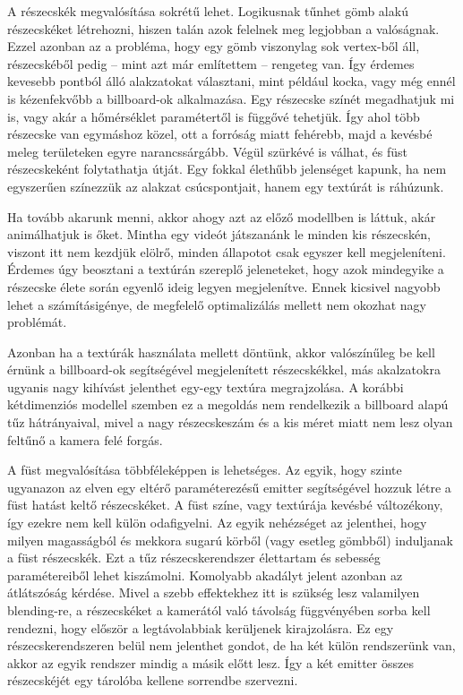 A részecskék megvalósítása sokrétű lehet. Logikusnak tűnhet gömb alakú részecskéket létrehozni, hiszen talán azok felelnek meg legjobban  a valóságnak. Ezzel azonban az a probléma, hogy egy gömb viszonylag sok vertex-ből áll, részecskéből pedig -- mint azt már említettem -- rengeteg van. Így érdemes kevesebb pontból álló alakzatokat választani, mint például kocka, vagy még ennél is kézenfekvőbb a billboard-ok alkalmazása. Egy részecske színét megadhatjuk mi is, vagy akár a hőmérséklet paramétertől is függővé tehetjük. Így ahol több részecske van egymáshoz közel, ott a forróság miatt fehérebb, majd a kevésbé meleg területeken egyre narancssárgább. Végül szürkévé is válhat, és füst részecskeként folytathatja útját. Egy fokkal élethűbb jelenséget kapunk, ha nem egyszerűen színezzük az alakzat csúcspontjait, hanem egy textúrát is ráhúzunk.

Ha tovább akarunk menni, akkor ahogy azt az előző modellben is láttuk, akár animálhatjuk is őket. Mintha egy videót játszanánk le minden kis részecskén, viszont itt nem kezdjük elölrő, minden állapotot csak egyszer kell megjeleníteni. Érdemes úgy beosztani a textúrán szereplő jeleneteket, hogy azok mindegyike a részecske élete során egyenlő ideig legyen megjelenítve. Ennek kicsivel nagyobb lehet a számításigénye, de megfelelő optimalizálás mellett nem okozhat nagy problémát. 

Azonban ha a textúrák használata mellett döntünk, akkor valószínűleg be kell érnünk a billboard-ok segítségével megjelenített részecskékkel, más akalzatokra ugyanis nagy kihívást jelenthet egy-egy textúra megrajzolása. A korábbi kétdimenziós modellel szemben ez a megoldás nem rendelkezik a billboard alapú tűz hátrányaival, mivel a nagy részecskeszám és a kis méret miatt nem lesz olyan feltűnő a kamera felé forgás. 

A füst megvalósítása többféleképpen is lehetséges. Az egyik, hogy szinte ugyanazon az elven egy eltérő paraméterezésű emitter segítségével hozzuk létre a füst hatást keltő részecskéket. A füst színe, vagy textúrája kevésbé változékony, így ezekre nem kell külön odafigyelni. Az egyik nehézséget az jelenthei, hogy milyen magasságból és mekkora sugarú körből (vagy esetleg gömbből) induljanak a füst részecskék. Ezt a tűz részecskerendszer élettartam és sebesség paramétereiből lehet kiszámolni. Komolyabb akadályt jelent azonban az átlátszóság kérdése. Mivel a szebb effektekhez itt is szükség lesz valamilyen blending-re, a részecskéket a kamerától való távolság függvényében sorba kell rendezni, hogy először a legtávolabbiak kerüljenek kirajzolásra. Ez egy részecskerendszeren belül nem jelenthet gondot, de ha két külön rendszerünk van, akkor az egyik rendszer mindig a másik előtt lesz. Így a két emitter összes részecskéjét egy tárolóba kellene sorrendbe szervezni.


